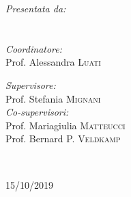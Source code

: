\documentclass[
12pt, %
english, %
onehalfspacing,%
headsepline, %
]{MastersDoctoralThesis} %
\numberwithin{equation}{chapter} %
\begin{document}
\begin{titlepage}
\begin{center}
			
			\begin{flushleft} 
				\begin{minipage}[t]{0.5\textwidth}
					\emph{Presentata da:}\\
					\authorname \\
					\vspace{20pt}\\%
					\emph{Coordinatore:}\\
					Prof. Alessandra \textsc{Luati} %
				\end{minipage}
			\end{flushleft}
			\vspace{-132px}
			\begin{flushright} 
				\begin{minipage}[t]{0.4\textwidth}
					\emph{Supervisore:}\\
					Prof. Stefania \textsc{Mignani}\\
					\emph{Co-supervisori:} \\
					Prof. Mariagiulia \textsc{Matteucci}\\
					Prof. Bernard P. \textsc{Veldkamp}
				\end{minipage}\\[3cm]
			\end{flushright}
			\vfill
			\vfill
			
			{ 15/10/2019}\\[4cm] %
			
			\vfill
		\end{center}
	\end{titlepage}
	
\end{document}
